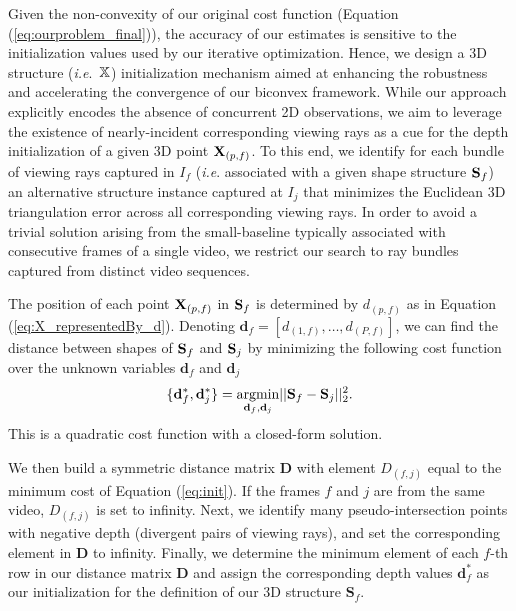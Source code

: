 Given the non-convexity of our original cost function (Equation (\ref{eq:ourproblem_final})), the accuracy of our estimates is  sensitive to the initialization values used by our iterative optimization. 
Hence, we design a 3D structure (\emph{i.e}.~$\mathbb X$) initialization mechanism aimed at
enhancing the robustness and accelerating the convergence of our biconvex framework.
While our approach explicitly encodes the absence of concurrent 2D observations, we aim to leverage the existence of nearly-incident corresponding viewing rays as a cue for the depth initialization of a given 3D point $\mathbf X_{(p,f)}$.
To this end, we identify for each bundle of viewing rays captured in $I_f$ (\emph{i.e}. associated with a given shape structure $\mathbf S_f$) an alternative structure instance captured at $I_j$ that minimizes the Euclidean 3D triangulation error across all corresponding viewing rays. In order to avoid a trivial solution arising from the small-baseline typically associated with consecutive frames of a single video, we restrict our search to ray bundles captured from distinct video sequences.

The position of each point $\mathbf X_{(p,f)}$ in $\mathbf S_f$ is determined by $d_{(p,f)}$ as in Equation (\ref{eq:X_representedBy_d}).
Denoting $\mathbf{d}_f = [d_{(1,f)}, \dots, d_{(P,f)} ]$, we can find the  distance between
shapes of $\mathbf S_f$ and $\mathbf S_j$ by minimizing the following cost function over the unknown variables $\mathbf{d}_f$ and $\mathbf{d}_j$
\begin{equation}
\{\mathbf{d}_f^*,\mathbf{d}_j^*\} =  \underset{\mathbf{d}_f,\mathbf{d}_j } {\text{argmin}} ||\mathbf S_f - \mathbf S_j ||_2^2.
\label{eq:init}
\end{equation}
This is a quadratic cost function with a closed-form solution. %

We then build a symmetric distance matrix $\mathbf{D}$ with element $D_{(f,j)}$ equal to the minimum cost of Equation (\ref{eq:init}).
If the frames $f$ and $j$ are from the same video, $D_{(f,j)}$ is set to infinity.
Next, we identify many pseudo-intersection points with negative depth (\ie divergent pairs of viewing rays), and set the corresponding element in $\mathbf{D}$ to infinity.
Finally, we determine the minimum element of each $f$-th row in our distance matrix $\mathbf{D}$ and assign the corresponding depth values $\mathbf d^*_f$ as our initialization for the definition of our 3D structure $\mathbf{S}_f$.

